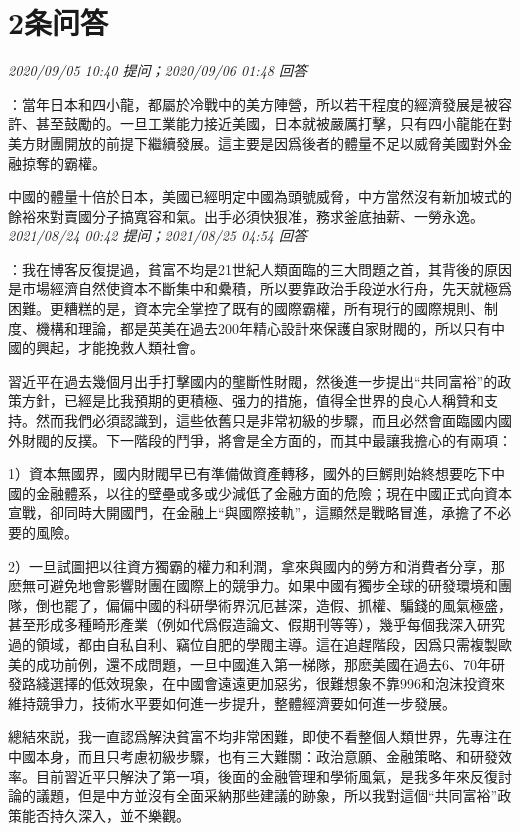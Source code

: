 \documentclass[twocolumn]{ctexart}
\begin{document}
\section{2条问答}

\textit{\hfill\noindent\small 2020/09/05 10:40 提问；2020/09/06 01:48 回答}

：當年日本和四小龍，都屬於冷戰中的美方陣營，所以若干程度的經濟發展是被容許、甚至鼓勵的。一旦工業能力接近美國，日本就被嚴厲打擊，只有四小龍能在對美方財團開放的前提下繼續發展。這主要是因爲後者的體量不足以威脅美國對外金融掠奪的霸權。

中國的體量十倍於日本，美國已經明定中國為頭號威脅，中方當然沒有新加坡式的餘裕來對賣國分子搞寬容和氣。出手必須快狠准，務求釜底抽薪、一勞永逸。
\\

\textit{\hfill\noindent\small 2021/08/24 00:42 提问；2021/08/25 04:54 回答}

：我在博客反復提過，貧富不均是21世紀人類面臨的三大問題之首，其背後的原因是市場經濟自然使資本不斷集中和纍積，所以要靠政治手段逆水行舟，先天就極爲困難。更糟糕的是，資本完全掌控了既有的國際霸權，所有現行的國際規則、制度、機構和理論，都是英美在過去200年精心設計來保護自家財閥的，所以只有中國的興起，才能挽救人類社會。

習近平在過去幾個月出手打擊國内的壟斷性財閥，然後進一步提出“共同富裕”的政策方針，已經是比我預期的更積極、强力的措施，值得全世界的良心人稱贊和支持。然而我們必須認識到，這些依舊只是非常初級的步驟，而且必然會面臨國内國外財閥的反撲。下一階段的鬥爭，將會是全方面的，而其中最讓我擔心的有兩項：

1）資本無國界，國内財閥早已有準備做資產轉移，國外的巨鰐則始終想要吃下中國的金融體系，以往的壁壘或多或少減低了金融方面的危險；現在中國正式向資本宣戰，卻同時大開國門，在金融上“與國際接軌”，這顯然是戰略冒進，承擔了不必要的風險。

2）一旦試圖把以往資方獨霸的權力和利潤，拿來與國内的勞方和消費者分享，那麽無可避免地會影響財團在國際上的競爭力。如果中國有獨步全球的研發環境和團隊，倒也罷了，偏偏中國的科研學術界沉厄甚深，造假、抓權、騙錢的風氣極盛，甚至形成多種畸形產業（例如代爲假造論文、假期刊等等），幾乎每個我深入研究過的領域，都由自私自利、竊位自肥的學閥主導。這在追趕階段，因爲只需複製歐美的成功前例，還不成問題，一旦中國進入第一梯隊，那麽美國在過去6、70年研發路綫選擇的低效現象，在中國會遠遠更加惡劣，很難想象不靠996和泡沫投資來維持競爭力，技術水平要如何進一步提升，整體經濟要如何進一步發展。

總結來説，我一直認爲解決貧富不均非常困難，即使不看整個人類世界，先專注在中國本身，而且只考慮初級步驟，也有三大難關：政治意願、金融策略、和研發效率。目前習近平只解決了第一項，後面的金融管理和學術風氣，是我多年來反復討論的議題，但是中方並沒有全面采納那些建議的跡象，所以我對這個“共同富裕”政策能否持久深入，並不樂觀。
\\
\end{document}
